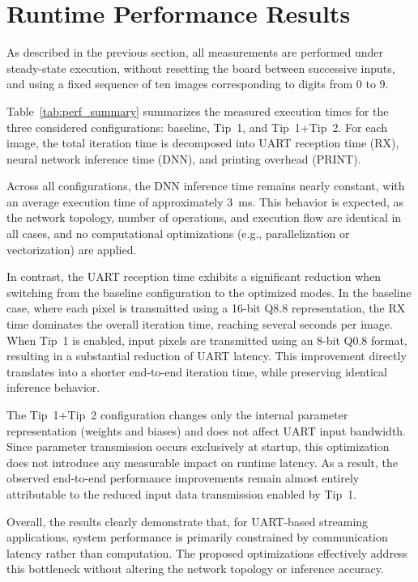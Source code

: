 \section{Runtime Performance Results}

As described in the previous section, all measurements are performed under
steady-state execution, without resetting the board between successive inputs,
and using a fixed sequence of ten images corresponding to digits from 0 to 9.

Table~\ref{tab:perf_summary} summarizes the measured execution times for the
three considered configurations: baseline, Tip~1, and Tip~1+Tip~2.
For each image, the total iteration time is decomposed into UART reception time
(RX), neural network inference time (DNN), and printing overhead (PRINT).

Across all configurations, the DNN inference time remains nearly constant,
with an average execution time of approximately 3~ms.
This behavior is expected, as the network topology, number of operations, and
execution flow are identical in all cases, and no computational optimizations
(e.g., parallelization or vectorization) are applied.

In contrast, the UART reception time exhibits a significant reduction when
switching from the baseline configuration to the optimized modes.
In the baseline case, where each pixel is transmitted using a 16-bit Q8.8
representation, the RX time dominates the overall iteration time, reaching
several seconds per image.
When Tip~1 is enabled, input pixels are transmitted using an 8-bit Q0.8 format,
resulting in a substantial reduction of UART latency.
This improvement directly translates into a shorter end-to-end iteration time,
while preserving identical inference behavior.

The Tip~1+Tip~2 configuration changes only the internal parameter representation
(weights and biases) and does not affect UART input bandwidth.
Since parameter transmission occurs exclusively at startup, this optimization
does not introduce any measurable impact on runtime latency.
As a result, the observed end-to-end performance improvements remain almost
entirely attributable to the reduced input data transmission enabled by Tip~1.

Overall, the results clearly demonstrate that, for UART-based streaming
applications, system performance is primarily constrained by communication
latency rather than computation.
The proposed optimizations effectively address this bottleneck without
altering the network topology or inference accuracy.



